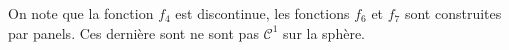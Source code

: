 \begin{remarque}
On note que la fonction $f_4$ est discontinue, les fonctions $f_6$ et $f_7$ sont construites par panels. Ces dernière sont ne sont pas $\mathcal{C}^1$ sur la sphère.
\end{remarque}










































